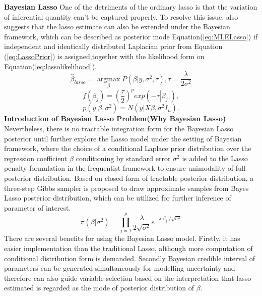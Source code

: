 \textbf{Bayesian Lasso}
One of the detriments of the ordinary lasso is that the variation of inferential quantity can't be captured properly. To resolve this issue, \cite{tibshirani_1996} also suggests that the lasso estimate can also be extended under the Bayesian framework, which can be described as posterior mode Equation(\ref{eq:MLELasso}) if independent and identically distributed Laplacian prior from Equation (\ref{eq:LassoPrior}) is assigned,together with the likelihood form on Equation(\ref{eq:lassolikelihood}). 
\begin{equation}
	\label{eq:MLELasso}
	\hat{\beta}_{lasso} = \underset{\beta}{\operatorname{argmax}}P(\beta|y,\sigma^2,\tau), \tau = \frac{\lambda}{2\sigma^2}
\end{equation}
\begin{equation}
	\label{eq:LassoPrior}
	f(\beta_j) = (\frac{\tau}{2})^p exp(-\tau|\beta_j|),
\end{equation}
\begin{equation}
	\label{eq:lassolikelihood}
	p(y |\beta,\sigma^2) = N(y|X\beta,\sigma^2I_n).
\end{equation}
\textbf{Introduction of Bayesian Lasso Problem(Why Bayesian Lasso)}
Nevertheless, there is no tractable integration form for the Bayesian Lasso posterior until \cite{park_casella_2008} further explore the Lasso model under the setting of Bayesian framework, where the choice of a conditional Laplace prior distribution over the regression coefficient $\beta$ conditioning by standard error $\sigma^2$ is added to the Lasso penalty formulation in the frequentist framework to ensure unimodality of full posterior distribution. Based on closed form of tractable posterior distribution, a three-step Gibbs sampler is proposed to draw approximate samples from Bayes Lasso posterior distribution, which can be utilized for further inference of parameter of interest.
\begin{equation}
	\label{eq:lassoprior}
	\pi(\beta |\sigma^2) = \prod_{j=1}^p \frac{\lambda}{2\sqrt{\sigma^2}} e^{-\lambda|\beta_j|/\sqrt{\sigma^2}}
\end{equation}
There are several benefits for using the Bayesian Lasso model. Firstly, it has easier implementation than the traditional Lasso, although more computation of conditional distribution form is demanded. Secondly Bayesian credible interval of parameters can be generated simultaneously for modelling uncertainty and therefore can also guide variable selection based on the interpretation that lasso estimated is regarded as the mode of posterior distribution of $\beta$. 
